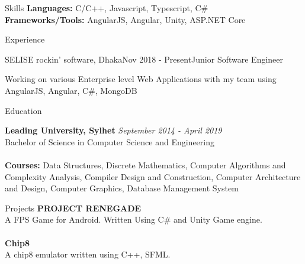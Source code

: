 \documentclass{resume}
\begin{document}

\begin{rSection}{Skills}
{\bf Languages:} C/C++, Javascript, Typescript, C\#\\
{\bf Frameworks/Tools:} AngularJS, Angular, Unity, ASP.NET Core
\end{rSection}


\begin{rSection}{Experience}

\begin{rSubsection}{SELISE rockin' software, Dhaka}{Nov 2018 - Present}{Junior Software Engineer}{}
\item Working on various Enterprise level Web Applications with my team using AngularJS, Angular, C\#, MongoDB
\end{rSubsection}

\end{rSection}


\begin{rSection}{Education}

{\bf Leading University, Sylhet} \hfill {\em September 2014 - April 2019}
\\ Bachelor of Science in Computer Science and Engineering \\
\\{\bf Courses:} Data Structures, Discrete Mathematics, Computer Algorithms and Complexity Analysis, Compiler Design and Construction, Computer Architecture and Design, Computer Graphics, Database Management System 
\end{rSection}

\begin{rSection}{Projects}
{\bf PROJECT RENEGADE}\\
A FPS Game for Android.
Written Using C\# and Unity Game engine.\\
\\{\bf Chip8}\\
A chip8 emulator written using C++, SFML.\\
\end{rSection}
\end{document}
